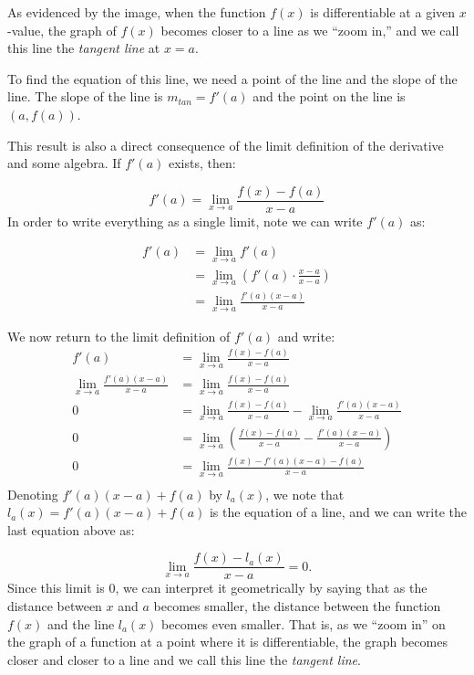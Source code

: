 \documentclass[nooutcomes]{ximera}
\begin{document}
As evidenced by the image, when the function $f(x)$ is differentiable
at a given $x$-value, the graph of $f(x)$ becomes closer to a line as
we ``zoom in,'' and we call this line the \emph{tangent line} at $x=a$.

To find the equation of this line, we need a point of the line and the
slope of the line.  The slope of the line is $m_{tan} =f'(a)$ and the
point on the line is $(a,f(a))$.


This result is also a direct consequence of the limit definition of
the derivative and some algebra.  If $f'(a)$ exists, then:

\[
f'(a) = \lim_{x \to a} \frac{f(x)-f(a)}{x-a}
\]
In order to write everything as a single limit, note we can write $f'(a)$ as:

\begin{align*}
  f'(a) &= \lim_{x \to a} f'(a)\\
  &= \lim_{x \to a} \left(f'(a) \cdot
  \frac{x-a}{x-a}\right)\\
  &= \lim_{x \to a} \frac{f'(a)(x-a)}{x-a}
\end{align*}

We now return to the limit definition of $f'(a)$ and write: 
\begin{align*}
f'(a) &= \lim_{x \to a} \frac{f(x)-f(a)}{x-a}\\
\lim_{x \to a} \frac{f'(a)(x-a)}{x-a} &= \lim_{x \to a} \frac{f(x)-f(a)}{x-a}\\
0 &= \lim_{x \to a} \frac{f(x)-f(a)}{x-a} - \lim_{x \to a} \frac{f'(a)(x-a)}{x-a}\\
0 &= \lim_{x \to a} \left(\frac{f(x)-f(a)}{x-a} - \frac{f'(a)(x-a)}{x-a} \right)\\
0 &= \lim_{x \to a} \frac{f(x)-f'(a)(x-a) - f(a)}{x-a}\\
\end{align*} 
Denoting $ f'(a)(x-a) + f(a)$ by $l_a(x)$, we note that $l_a(x)= f'(a)(x-a) + f(a)$ is the equation of a line, and we can write the last equation above as:

\[
\lim_{x \to a} \frac{f(x)-l_a(x)}{x-a} = 0.
\]
Since this limit is $0$, we can interpret it geometrically by saying
that as the distance between $x$ and $a$ becomes smaller, the distance
between the function $f(x)$ and the line $l_a(x)$ becomes even
smaller.  That is, as we ``zoom in'' on the graph of a function at a
point where it is differentiable, the graph becomes closer and closer
to a line and we call this line the \emph{tangent line}.
\end{document}
